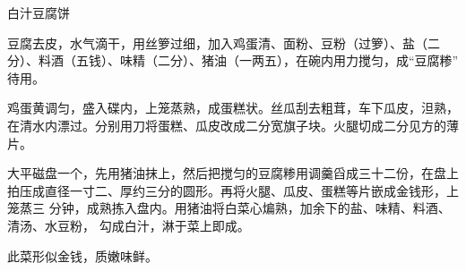 \begin{recipe}[金钱豆腐]{白汁豆腐饼}

\ingredients


\preparation

\step 豆腐去皮，水气滴干，用丝箩过细，加入鸡蛋清、面粉、豆粉（过箩）、盐（二
分）、料酒（五钱）、味精（二分）、猪油（一两五），在碗内用力搅匀，成“豆腐糁”
待用。

\step 鸡蛋黄调匀，盛入碟内，上笼蒸熟，成蛋糕状。丝瓜刮去粗茸，车下瓜皮，泹熟，
在清水内漂过。分别用刀将蛋糕、瓜皮改成二分宽旗子块。火腿切成二分见方的薄片。

\step 大平磁盘一个，先用猪油抹上，然后把搅匀的豆腐糁用调羹舀成三十二份，在盘上
拍压成直径一寸二、厚约三分的圆形。再将火腿、瓜皮、蛋糕等片嵌成金钱形，上笼蒸三
分钟，成熟拣入盘内。用猪油将白菜心煸熟，加余下的盐、味精、料酒、清汤、水豆粉，
勾成白汁，淋于菜上即成。

\features

此菜形似金钱，质嫩味鲜。

\end{recipe}

